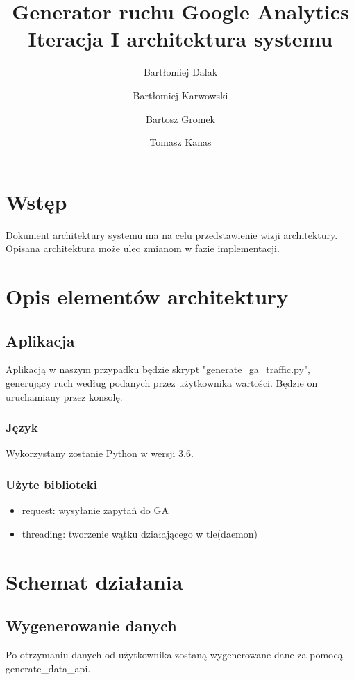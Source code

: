 \documentclass{article}
\title{Generator ruchu Google Analytics \\ Iteracja I architektura systemu}
\author{Bartłomiej Dalak \and Bartłomiej Karwowski \and Bartosz Gromek \and Tomasz Kanas}
\begin{document}
\maketitle

\section{Wstęp}

Dokument architektury systemu ma na celu przedstawienie wizji architektury. Opisana architektura może ulec zmianom w fazie implementacji.

\section{Opis elementów architektury}

\subsection{Aplikacja}

Aplikacją w naszym przypadku będzie skrypt "generate\_ga\_traffic.py", generujący ruch według podanych przez użytkownika wartości. Będzie on uruchamiany przez konsolę.

\subsubsection{Język}

Wykorzystany zostanie Python w wersji 3.6.

\subsubsection{Użyte biblioteki}

\begin{itemize}
\item request: wysyłanie zapytań do GA
\item threading: tworzenie wątku działającego w tle(daemon)
\end{itemize}

\section{Schemat działania}

\subsection{Wygenerowanie danych}
Po otrzymaniu danych od użytkownika zostaną wygenerowane dane za pomocą generate\_data\_api.
\end{document}
